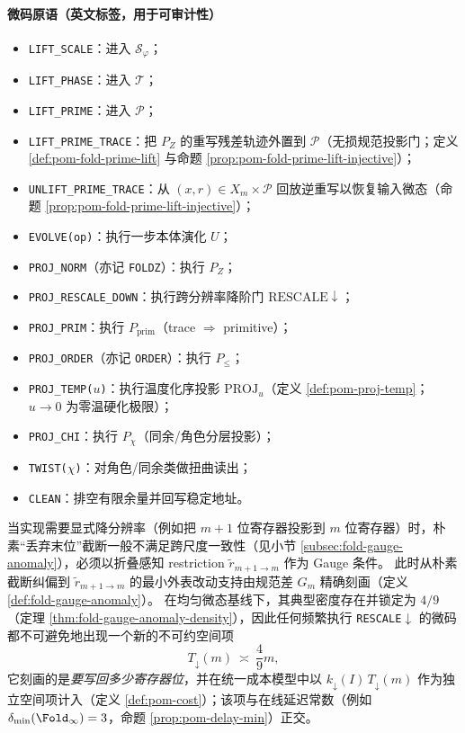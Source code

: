 \paragraph{微码原语（英文标签，用于可审计性）}
\begin{itemize}
  \item \texttt{LIFT\_SCALE}：进入 $\mathcal{S}_\varphi$；
  \item \texttt{LIFT\_PHASE}：进入 $\mathcal{T}$；
  \item \texttt{LIFT\_PRIME}：进入 $\mathcal{P}$；
  \item \texttt{LIFT\_PRIME\_TRACE}：把 $P_Z$ 的重写残差轨迹外置到 $\mathcal{P}$（无损规范投影门；定义 \ref{def:pom-fold-prime-lift} 与命题 \ref{prop:pom-fold-prime-lift-injective}）；
  \item \texttt{UNLIFT\_PRIME\_TRACE}：从 $(x,r)\in X_m\times\mathcal{P}$ 回放逆重写以恢复输入微态（命题 \ref{prop:pom-fold-prime-lift-injective}）；
  \item \texttt{EVOLVE(op)}：执行一步本体演化 $U$；
  \item \texttt{PROJ\_NORM}（亦记 \texttt{FOLDZ}）：执行 $P_Z$；
  \item \texttt{PROJ\_RESCALE\_DOWN}：执行跨分辨率降阶门 $\mathrm{RESCALE}\downarrow$；
  \item \texttt{PROJ\_PRIM}：执行 $P_{\mathrm{prim}}$（trace $\Rightarrow$ primitive）；
  \item \texttt{PROJ\_ORDER}（亦记 \texttt{ORDER}）：执行 $P_{\le}$；
  \item \texttt{PROJ\_TEMP($u$)}：执行温度化序投影 $\mathrm{PROJ}_u$（定义 \ref{def:pom-proj-temp}；$u\to 0$ 为零温硬化极限）；
  \item \texttt{PROJ\_CHI}：执行 $P_\chi$（同余/角色分层投影）；
  \item \texttt{TWIST($\chi$)}：对角色/同余类做扭曲读出；
  \item \texttt{CLEAN}：排空有限余量并回写稳定地址。
\end{itemize}

\begin{remark}\label{rem:pom-rescale-space-constant}
当实现需要显式降分辨率（例如把 \(m{+}1\) 位寄存器投影到 \(m\) 位寄存器）时，朴素“丢弃末位”截断一般不满足跨尺度一致性（见小节 \ref{subsec:fold-gauge-anomaly}），必须以折叠感知 restriction \(\widetilde r_{m+1\to m}\) 作为 Gauge 条件。
此时从朴素截断纠偏到 \(\widetilde r_{m+1\to m}\) 的最小外表改动支持由规范差 \(G_m\) 精确刻画（定义 \ref{def:fold-gauge-anomaly}）。
在均匀微态基线下，其典型密度存在并锁定为 \(4/9\)（定理 \ref{thm:fold-gauge-anomaly-density}），因此任何频繁执行 \texttt{RESCALE}$\downarrow$ 的微码都不可避免地出现一个新的不可约空间项
\[
T_{\downarrow}(m)\ \asymp\ \frac{4}{9}m,
\]
它刻画的是\emph{要写回多少寄存器位}，并在统一成本模型中以 $k_{\downarrow}(I)\,T_{\downarrow}(m)$ 作为独立空间项计入（定义 \ref{def:pom-cost}）；该项与在线延迟常数（例如 \(\delta_{\min}(\Fold_\infty)=3\)，命题 \ref{prop:pom-delay-min}）正交。
\end{remark}

